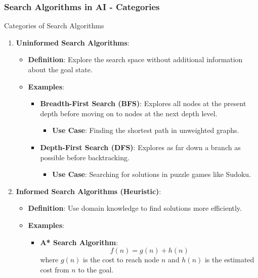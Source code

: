 \documentclass[aspectratio=169]{beamer}
\begin{document}
\begin{frame}[fragile]
    \frametitle{Search Algorithms in AI - Categories}
    \begin{block}{Categories of Search Algorithms}
        \begin{enumerate}
            \item \textbf{Uninformed Search Algorithms}:
            \begin{itemize}
                \item \textbf{Definition}: Explore the search space without additional information about the goal state.
                \item \textbf{Examples}:
                \begin{itemize}
                    \item \textbf{Breadth-First Search (BFS)}: Explores all nodes at the present depth before moving on to nodes at the next depth level.
                    \begin{itemize}
                        \item \textbf{Use Case}: Finding the shortest path in unweighted graphs.
                    \end{itemize}
                    \item \textbf{Depth-First Search (DFS)}: Explores as far down a branch as possible before backtracking.
                    \begin{itemize}
                        \item \textbf{Use Case}: Searching for solutions in puzzle games like Sudoku.
                    \end{itemize}
                \end{itemize}
            \end{itemize}
            \item \textbf{Informed Search Algorithms (Heuristic)}:
            \begin{itemize}
                \item \textbf{Definition}: Use domain knowledge to find solutions more efficiently.
                \item \textbf{Examples}:
                \begin{itemize}
                    \item \textbf{A* Search Algorithm}: 
                    \begin{equation}
                    f(n) = g(n) + h(n)
                    \end{equation}
                    where \( g(n) \) is the cost to reach node \( n \) and \( h(n) \) is the estimated cost from \( n \) to the goal.

\end{itemize}
\end{itemize}
\end{enumerate}
\end{block}
\end{frame}
\end{document}
